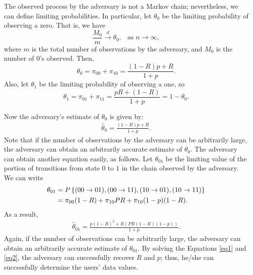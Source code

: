 \begin{example}
The observed process by the adversary is not a Markov chain; nevertheless, we can define limiting probabilities. In particular, let $\theta_0$ be the limiting probability of observing a zero. That is, we have
\[
\frac{M_0}{m} \xrightarrow{d} \theta_0,  \ \ \textrm{ as }n \rightarrow \infty,
\]
where $m$ is the total number of observations by the adversary, and $M_0$ is the number of $0$'s observed. Then,
\[\theta_0= \pi_{00}+\pi_{10} =\frac{(1-R)p+R}{1+p}.\]
Also, let $\theta_1$ be the limiting probability of observing a one, so
\[\theta_1= \pi_{01}+\pi_{11} =\frac{pR+(1-R)}{1+p}=1-\theta_0.\]


Now the adversary's estimate of $\theta_0$ is given by:
\begin{align}\label{eq1}
\hat{\theta}_0= \frac{(1-R)p+R}{1+p}.
\end{align}
Note that if the number of observations by the adversary can be arbitrarily large, the adversary can obtain an arbitrarily accurate estimate of $\theta_0$.
The adversary can obtain another equation easily, as follows.   Let $\theta_{01}$ be the limiting value of the portion of transitions from state $0$ to $1$ in the chain observed by the adversary. We can write
\begin{align}
\nonumber \theta_{01} &=P \left\{(00\rightarrow 01), (00\rightarrow 11), (10 \rightarrow 01), (10 \rightarrow 11) \right\}\\\
\nonumber &= \pi_{00}(1-R)+\pi_{10}PR+ \pi_{10}(1-p)(1-R).\ \
\end{align}
As a result,
\begin{align}\label{eq2}
\hat{\theta}_{01}= \frac{p(1-R)^2+R\left(PR(1-R)(1-p)\right)}{1+p}.
\end{align}
Again, if the number of observations can be arbitrarily large, the adversary can obtain an arbitrarily accurate estimate of $\theta_{01}$.
By solving the Equations \ref{eq1} and \ref{eq2}, the adversary can successfully recover $R$ and $p$; thus, he/she can successfully determine the users' data values.

\end{example}


